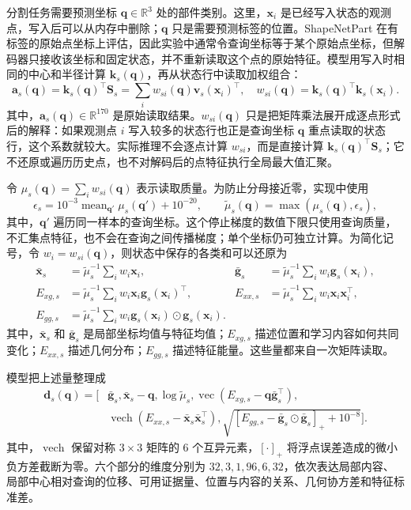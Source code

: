 \documentclass[UTF8,a4paper,11pt,fontset=windows]{ctexart}
\newcommand{\R}{\mathbb{R}}
\newcommand{\Sstate}{\mathbf{S}}
\newcommand{\vect}{\operatorname{vec}}
\begin{document}
分割任务需要预测坐标 $\bm q\in\R^3$ 处的部件类别。这里，$\bm x_i$ 是已经写入状态的观测点，写入后可以从内存中删除；$\bm q$ 只是需要预测标签的位置。ShapeNetPart 在有标签的原始点坐标上评估，因此实验中通常令查询坐标等于某个原始点坐标，但解码器只接收该坐标和固定状态，并不重新读取这个点的原始特征。模型用写入时相同的中心和半径计算 $\bm k_s(\bm q)$，再从状态行中读取加权组合：
\begin{equation}
\bm a_s(\bm q)=\bm k_s(\bm q)^\top\Sstate_s
=\sum_i w_{si}(\bm q)\bm v_s(\bm x_i)^\top,
\quad
w_{si}(\bm q)=\bm k_s(\bm q)^\top\bm k_s(\bm x_i).
\label{eq:effective-weight}
\end{equation}
其中，$\bm a_s(\bm q)\in\R^{170}$ 是原始读取结果。$w_{si}(\bm q)$ 只是把矩阵乘法展开成逐点形式后的解释：如果观测点 $i$ 写入较多的状态行也正是查询坐标 $\bm q$ 重点读取的状态行，这个系数就较大。实际推理不会逐点计算 $w_{si}$，而是直接计算 $\bm k_s(\bm q)^\top\Sstate_s$；它不还原或遍历历史点，也不对解码后的点特征执行全局最大值汇聚。

令 $\mu_s(\bm q)=\sum_iw_{si}(\bm q)$ 表示读取质量。为防止分母接近零，实现中使用
\begin{equation}
\epsilon_s=10^{-3}\operatorname{mean}_{\bm q'}\mu_s(\bm q')+10^{-20},
\qquad
\widetilde\mu_s(\bm q)=\max(\mu_s(\bm q),\epsilon_s),
\end{equation}
其中，$\bm q'$ 遍历同一样本的查询坐标。这个停止梯度的数值下限只使用查询质量，不汇集点特征，也不会在查询之间传播梯度；单个坐标仍可独立计算。为简化记号，令 $w_i=w_{si}(\bm q)$，则状态中保存的各类和可以还原为
\begin{align}
\bar{\bm x}_s&=\widetilde\mu_s^{-1}\sum_iw_i\bm x_i,&
\bar{\bm g}_s&=\widetilde\mu_s^{-1}\sum_iw_i\bm g_s(\bm x_i),\nonumber\\
E_{xg,s}&=\widetilde\mu_s^{-1}\sum_iw_i\bm x_i\bm g_s(\bm x_i)^\top,&
E_{xx,s}&=\widetilde\mu_s^{-1}\sum_iw_i\bm x_i\bm x_i^\top,\nonumber\\
E_{gg,s}&=\widetilde\mu_s^{-1}\sum_iw_i\bm g_s(\bm x_i)\odot\bm g_s(\bm x_i).&&
\label{eq:read-moments}
\end{align}
其中，$\bar{\bm x}_s$ 和 $\bar{\bm g}_s$ 是局部坐标均值与特征均值；$E_{xg,s}$ 描述位置和学习内容如何共同变化；$E_{xx,s}$ 描述几何分布；$E_{gg,s}$ 描述特征能量。这些量都来自一次矩阵读取。

模型把上述量整理成
\begin{equation}
\begin{aligned}
\bm d_s(\bm q)=[&\bar{\bm g}_s,\bar{\bm x}_s-\bm q,\log\widetilde\mu_s,
\vect(E_{xg,s}-\bm q\bar{\bm g}_s^{\top}),\\
&\operatorname{vech}(E_{xx,s}-\bar{\bm x}_s\bar{\bm x}_s^{\top}),
\sqrt{[E_{gg,s}-\bar{\bm g}_s\odot\bar{\bm g}_s]_++10^{-8}}].
\end{aligned}
\label{eq:query-decode}
\end{equation}
其中，$\operatorname{vech}$ 保留对称 $3\times3$ 矩阵的 6 个互异元素，$[\cdot]_+$ 将浮点误差造成的微小负方差截断为零。六个部分的维度分别为 $32,3,1,96,6,32$，依次表达局部内容、局部中心相对查询的位移、可用证据量、位置与内容的关系、几何协方差和特征标准差。
\end{document}
